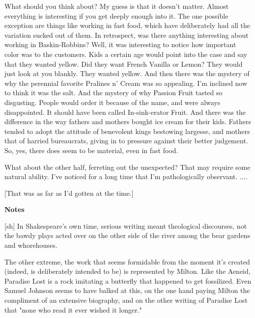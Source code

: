 What should you think about?  My guess is that it
doesn't matter.  Almost everything is
interesting if you get deeply
enough into it.  The one possible exception
are
things
like working in fast food, which
have deliberately had all
the variation sucked out of them.
In retrospect, was there
anything interesting about working in Baskin-Robbins?
Well, it was interesting to notice
how important color was
to the customers.  Kids a certain age would point into
the case and say that they wanted yellow.  Did they want
French Vanilla or Lemon?  They would just look at you
blankly.  They wanted yellow.  And then there was the
mystery of why the perennial favorite Pralines n' Cream
was so appealing. I'm inclined now to
think it was the salt.
And the mystery of why Passion Fruit tasted so disgusting.
People would order it because of the name, and were always
disappointed.  It should have been called In-sink-erator
Fruit.
And there was
the difference in the way fathers and
mothers bought ice cream for their kids.
Fathers tended to
adopt the attitude of
benevolent kings bestowing largesse,
and mothers that of
harried bureaucrats,
giving in to
pressure against their better judgement.
So, yes, there does seem to be material, even in
fast food.

What about the other half, ferreting out the unexpected?
That may require some natural ability.  I've noticed for
a long time that I'm pathologically observant.  ....

[That was as far as I'd gotten at the time.]



\textbf{Notes}

[sh] In Shakespeare's own time, serious writing meant theological
discourses, not the bawdy plays acted over on the other  
side of the river among the bear gardens and whorehouses.

The other extreme, the work that seems formidable from the moment
it's created (indeed, is deliberately intended to be)
is represented by Milton.  Like the Aeneid, Paradise Lost is a
rock imitating a butterfly that happened to get fossilized.
Even Samuel Johnson seems to have balked at this, on the one  
hand paying Milton the compliment of an extensive biography,
and on the other writing of Paradise Lost that "none who read it
ever wished it longer."








